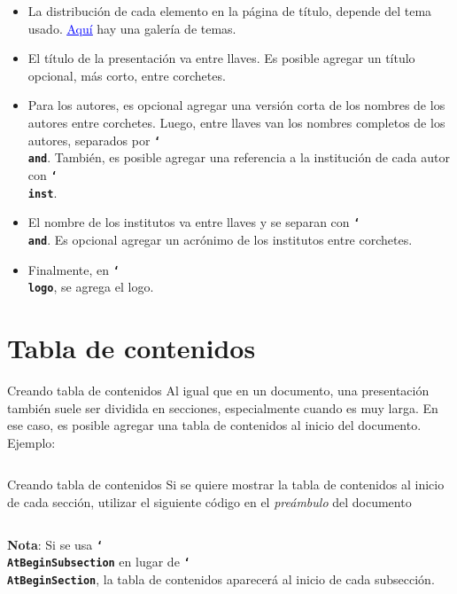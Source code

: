 \documentclass{beamer}
\newcommand{\bftt}[1]{\textbf{\texttt{#1}}}
\newcommand{\cmd}[1]{{\color[HTML]{008000}\bftt{#1}}}
\newcommand{\bs}{\char`\\}
\newcommand{\cmdbs}[1]{\cmd{\bs#1}}
\begin{document}
    \begin{frame}
        \begin{itemize}
            \justifying
            \item La distribución de cada elemento en la página de título, depende del tema usado. \href{http://deic.uab.es/~iblanes/beamer_gallery/}{\textcolor{blue}{\underline{Aquí}}} hay una galería de temas.
            \item El título de la presentación va entre llaves. Es posible agregar un título opcional, más corto, entre corchetes.
            \item Para los autores, es opcional agregar una versión corta de los nombres de los autores entre corchetes. Luego, entre llaves van los nombres completos de los autores, separados por \cmdbs{and}. También, es posible agregar una referencia a la institución de cada autor con \cmdbs{inst}.
            \item El nombre de los institutos va entre llaves y se separan con \cmdbs{and}. Es opcional agregar un acrónimo de los institutos entre corchetes.
            \item Finalmente, en \cmdbs{logo}, se agrega el logo.
        \end{itemize}
    \end{frame}

    \section{Tabla de contenidos}
    \begin{frame}{Creando tabla de contenidos}
        \justifying
        Al igual que en un documento, una presentación también suele ser dividida en secciones, especialmente cuando es muy larga. En ese caso, es posible agregar una tabla de contenidos al inicio del documento. Ejemplo:
        \begin{center}
            \begin{minipage}{0.45\linewidth}
                \inputminted[fontsize=\scriptsize, frame=single]{latex}{contents_frame.tex}
            \end{minipage}
        \end{center}
    \end{frame}
    \begin{frame}{Creando tabla de contenidos}
        \justifying
        Si se quiere mostrar la tabla de contenidos al inicio de cada sección, utilizar el siguiente código en el \textsl{preámbulo} del documento
        \begin{center}
            \begin{minipage}{0.52\linewidth}
                \inputminted[fontsize=\scriptsize, frame=single]{latex}{contents_frame2.tex}
            \end{minipage}
        \end{center}
        \textbf{Nota}: Si se usa \cmdbs{AtBeginSubsection} en lugar de \cmdbs{AtBeginSection}, la tabla de contenidos aparecerá al inicio de cada subsección.
    \end{frame}
\end{document}

